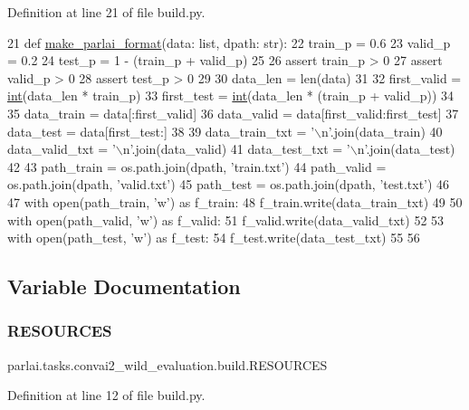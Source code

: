 Definition at line 21 of file build.\+py.


\begin{DoxyCode}
21 \textcolor{keyword}{def }\hyperlink{namespaceparlai_1_1tasks_1_1quac_1_1build_a08c212462b5c58cde91192d35f24f0cc}{make\_parlai\_format}(data: list, dpath: str):
22     train\_p = 0.6
23     valid\_p = 0.2
24     test\_p = 1 - (train\_p + valid\_p)
25 
26     \textcolor{keyword}{assert} train\_p > 0
27     \textcolor{keyword}{assert} valid\_p > 0
28     \textcolor{keyword}{assert} test\_p > 0
29 
30     data\_len = len(data)
31 
32     first\_valid = \hyperlink{namespacelanguage__model_1_1eval__ppl_a7d12ee00479673c5c8d1f6d01faa272a}{int}(data\_len * train\_p)
33     first\_test = \hyperlink{namespacelanguage__model_1_1eval__ppl_a7d12ee00479673c5c8d1f6d01faa272a}{int}(data\_len * (train\_p + valid\_p))
34 
35     data\_train = data[:first\_valid]
36     data\_valid = data[first\_valid:first\_test]
37     data\_test = data[first\_test:]
38 
39     data\_train\_txt = \textcolor{stringliteral}{'\(\backslash\)n'}.join(data\_train)
40     data\_valid\_txt = \textcolor{stringliteral}{'\(\backslash\)n'}.join(data\_valid)
41     data\_test\_txt = \textcolor{stringliteral}{'\(\backslash\)n'}.join(data\_test)
42 
43     path\_train = os.path.join(dpath, \textcolor{stringliteral}{'train.txt'})
44     path\_valid = os.path.join(dpath, \textcolor{stringliteral}{'valid.txt'})
45     path\_test = os.path.join(dpath, \textcolor{stringliteral}{'test.txt'})
46 
47     with open(path\_train, \textcolor{stringliteral}{'w'}) \textcolor{keyword}{as} f\_train:
48         f\_train.write(data\_train\_txt)
49 
50     with open(path\_valid, \textcolor{stringliteral}{'w'}) \textcolor{keyword}{as} f\_valid:
51         f\_valid.write(data\_valid\_txt)
52 
53     with open(path\_test, \textcolor{stringliteral}{'w'}) \textcolor{keyword}{as} f\_test:
54         f\_test.write(data\_test\_txt)
55 
56 
\end{DoxyCode}


\subsection{Variable Documentation}
\mbox{\label{namespaceparlai_1_1tasks_1_1convai2__wild__evaluation_1_1build_aec445685ba4d77fbe9b8ad4cdc90cbab}} 
\subsubsection{\texorpdfstring{R\+E\+S\+O\+U\+R\+C\+ES}{RESOURCES}}
{\footnotesize\ttfamily parlai.\+tasks.\+convai2\+\_\+wild\+\_\+evaluation.\+build.\+R\+E\+S\+O\+U\+R\+C\+ES}



Definition at line 12 of file build.\+py.

